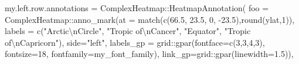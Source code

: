 \documentclass[
]{article}
\newenvironment{Shaded}{\begin{snugshade}}{\end{snugshade}}
\newcommand{\AttributeTok}[1]{\textcolor[rgb]{0.77,0.63,0.00}{#1}}
\newcommand{\DecValTok}[1]{\textcolor[rgb]{0.00,0.00,0.81}{#1}}
\newcommand{\FloatTok}[1]{\textcolor[rgb]{0.00,0.00,0.81}{#1}}
\newcommand{\FunctionTok}[1]{\textcolor[rgb]{0.00,0.00,0.00}{#1}}
\newcommand{\NormalTok}[1]{#1}
\newcommand{\OtherTok}[1]{\textcolor[rgb]{0.56,0.35,0.01}{#1}}
\newcommand{\SpecialCharTok}[1]{\textcolor[rgb]{0.00,0.00,0.00}{#1}}
\newcommand{\StringTok}[1]{\textcolor[rgb]{0.31,0.60,0.02}{#1}}
\begin{document}
\begin{Shaded}
\begin{Highlighting}[]

\NormalTok{my.left.row.annotations }\OtherTok{=}\NormalTok{ ComplexHeatmap}\SpecialCharTok{::}\FunctionTok{HeatmapAnnotation}\NormalTok{(}
  \AttributeTok{foo =}\NormalTok{ ComplexHeatmap}\SpecialCharTok{::}\FunctionTok{anno\_mark}\NormalTok{(}\AttributeTok{at =} \FunctionTok{match}\NormalTok{(}\FunctionTok{c}\NormalTok{(}\FloatTok{66.5}\NormalTok{, }\FloatTok{23.5}\NormalTok{, }\DecValTok{0}\NormalTok{, }\SpecialCharTok{{-}}\FloatTok{23.5}\NormalTok{),}\FunctionTok{round}\NormalTok{(ylat,}\DecValTok{1}\NormalTok{)),}
                                  \AttributeTok{labels =} \FunctionTok{c}\NormalTok{(}\StringTok{"Arctic}\SpecialCharTok{\textbackslash{}n}\StringTok{Circle"}\NormalTok{,}
                                             \StringTok{"Tropic of}\SpecialCharTok{\textbackslash{}n}\StringTok{Cancer"}\NormalTok{,}
                                             \StringTok{"Equator"}\NormalTok{,}
                                             \StringTok{"Tropic of}\SpecialCharTok{\textbackslash{}n}\StringTok{Capricorn"}\NormalTok{),}
                                  \AttributeTok{side=}\StringTok{"left"}\NormalTok{,}
                                  \AttributeTok{labels\_gp =}\NormalTok{ grid}\SpecialCharTok{::}\FunctionTok{gpar}\NormalTok{(}\AttributeTok{fontface=}\FunctionTok{c}\NormalTok{(}\DecValTok{3}\NormalTok{,}\DecValTok{3}\NormalTok{,}\DecValTok{4}\NormalTok{,}\DecValTok{3}\NormalTok{),}
                                                         \AttributeTok{fontsize=}\DecValTok{18}\NormalTok{,}
                                                         \AttributeTok{fontfamily=}\NormalTok{my\_font\_family),}
                                  \AttributeTok{link\_gp=}\NormalTok{grid}\SpecialCharTok{::}\FunctionTok{gpar}\NormalTok{(}\AttributeTok{linewidth=}\FloatTok{1.5}\NormalTok{)),}


\end{Highlighting}
\end{Shaded}
\end{document}
